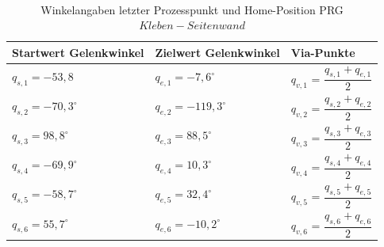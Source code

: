 \\
\begin{table}[tbph]
\centering
\caption{Winkelangaben letzter Prozesspunkt und Home-Position PRG $Kleben-Seitenwand$}
\label{tab:simu}
\begin{tabular}{|l|l|l|}
	\hline
	Startwert Gelenkwinkel&  Zielwert Gelenkwinkel&  Via-Punkte\\
	\hline
	$q_{s,1} = -53,8$&  $q_{e,1} = -7,6^{\circ}$  &$q_{v,1}$ = $\dfrac{q_{s,1}+q_{e,1}}{2}$  \\
	\hline
	$q_{s,2} = -70,3^{\circ}$&  $q_{e,2} = -119,3^{\circ}$    &$q_{v,2}$ = $\dfrac{q_{s,2}+q_{e,2}}{2}$  \\
	\hline
	$q_{s,3} = 98,8^{\circ}$&  $q_{e,3} = 88,5^{\circ}$&$q_{v,3}$ = $\dfrac{q_{s,3}+q_{e,3}}{2}$  \\
	\hline
	$q_{s,4} = -69,9^{\circ}$&  $q_{e,4} = 10,3^{\circ}$&$q_{v,4}$ = $\dfrac{q_{s,4}+q_{e,4}}{2}$  \\
	\hline
	$q_{s,5} = -58,7^{\circ}$&  $q_{e,5} = 32,4^{\circ}$  &$q_{v,5}$ = $\dfrac{q_{s,5}+q_{e,5}}{2}$  \\
	\hline
	$q_{s,6} = 55,7^{\circ}$&  $q_{e,6} = -10,2^{\circ}$&$q_{v,6}$ = $\dfrac{q_{s,6}+q_{e,6}}{2}$  \\
	\hline
\end{tabular}
\end{table}
\\
